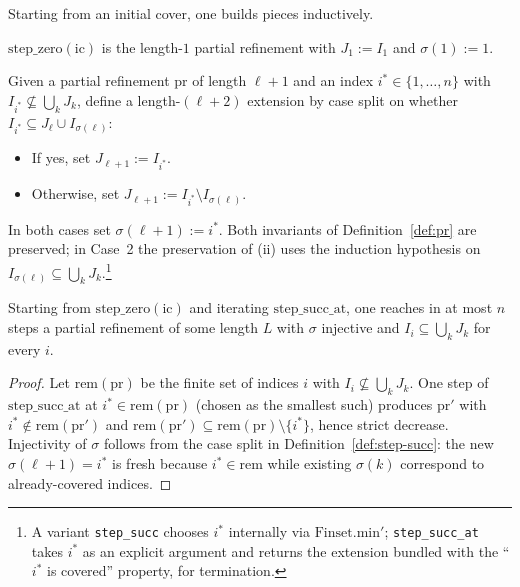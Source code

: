 Starting from an initial cover, one builds pieces inductively.

\begin{definition}
\label{def:step0}
$\mathrm{step\_zero}(\mathrm{ic})$ is the length-$1$ partial
refinement with
$J_1 := I_1$ and $\sigma(1) := 1$.
\end{definition}

\begin{definition}
\label{def:step-succ}
Given a partial refinement $\mathrm{pr}$ of length $\ell+1$ and
an index $i^* \in \{1,\ldots,n\}$ with
$I_{i^*} \not\subseteq \bigcup_k J_k$, define a length-$(\ell+2)$
extension by case split on whether
$I_{i^*} \subseteq J_\ell \cup I_{\sigma(\ell)}$:

\begin{itemize}
\item[(Case 1)] If yes, set $J_{\ell+1} := I_{i^*}$.
\item[(Case 2)] Otherwise, set
  $J_{\ell+1} := I_{i^*} \setminus I_{\sigma(\ell)}$.
\end{itemize}

In both cases set $\sigma(\ell+1) := i^*$. Both invariants of
Definition~\ref{def:pr} are preserved; in Case~2 the preservation
of (ii) uses the induction hypothesis on
$I_{\sigma(\ell)} \subseteq \bigcup_k J_k$.\footnote{A variant
\texttt{step\_succ} chooses $i^*$ internally via
$\mathrm{Finset.min'}$; \texttt{step\_succ\_at} takes $i^*$ as an
explicit argument and returns the extension bundled with the
``$i^*$ is covered'' property, for termination.}
\end{definition}

\begin{proposition}[Termination]
\label{prop:exists-terminal}
Starting from $\mathrm{step\_zero}(\mathrm{ic})$ and iterating
$\mathrm{step\_succ\_at}$, one reaches in at most $n$ steps a
partial refinement of some length $L$ with $\sigma$ injective
and $I_i \subseteq \bigcup_k J_k$ for every $i$.
\end{proposition}

\begin{proof}
Let $\mathrm{rem}(\mathrm{pr})$ be the finite set of indices
$i$ with $I_i \not\subseteq \bigcup_k J_k$. One step of
$\mathrm{step\_succ\_at}$ at $i^* \in \mathrm{rem}(\mathrm{pr})$
(chosen as the smallest such) produces $\mathrm{pr}'$ with
$i^* \notin \mathrm{rem}(\mathrm{pr}')$ and
$\mathrm{rem}(\mathrm{pr}') \subseteq \mathrm{rem}(\mathrm{pr})
\setminus \{i^*\}$, hence strict decrease. Injectivity of
$\sigma$ follows from the case split in
Definition~\ref{def:step-succ}: the new $\sigma(\ell+1) = i^*$
is fresh because $i^* \in \mathrm{rem}$ while existing
$\sigma(k)$ correspond to already-covered indices.
\end{proof}

